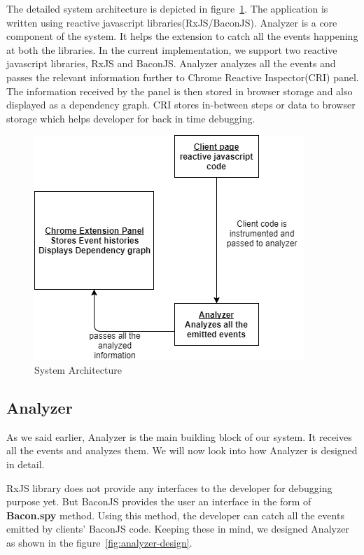 The detailed system architecture is depicted in figure~\ref{fig:system-architecture}. The application is written using reactive javascript libraries(RxJS/BaconJS). Analyzer is a core component of the system. It helps the extension to catch all the events happening at both the libraries. In the current implementation, we support two reactive javascript libraries, RxJS and BaconJS. Analyzer analyzes all the events and passes the relevant information further to Chrome Reactive Inspector(CRI) panel. The information received by the panel is then stored in browser storage and also displayed as a dependency graph. CRI stores in-between steps or data to browser storage which helps developer for back in time debugging.

\begin{figure}[!h]
	\centering
	\includegraphics[scale=0.6,trim=0 0 0 0]{images/system-architecture.png}
	\caption{System Architecture}
	\label{fig:system-architecture}
\end{figure}

\subsection{Analyzer}
As we said earlier, Analyzer is the main building block of our system. It receives all the events and analyzes them. We will now look into how Analyzer is designed in detail.

RxJS library does not provide any interfaces to the developer for debugging purpose yet. But BaconJS provides the user an interface in the form of \textbf{Bacon.spy} method. Using this method, the developer can catch all the events emitted by clients' BaconJS code. Keeping these in mind, we designed Analyzer as shown in the figure~\ref{fig:analyzer-design}. 

